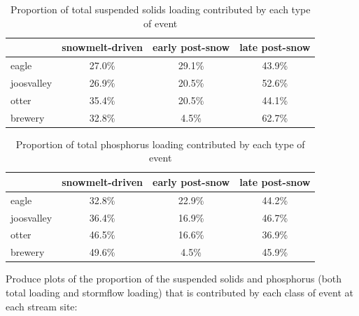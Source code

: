 \documentclass[12pt]{article}
\begin{document}
\begin{table}[h]
\begin{center}
\begin{tabular}{lccc}
  & snowmelt-driven & early post-snow & late post-snow \\ 
  \hline
eagle & 27.0\% & 29.1\% & 43.9\% \\ 
  joosvalley & 26.9\% & 20.5\% & 52.6\% \\ 
  otter & 35.4\% & 20.5\% & 44.1\% \\ 
  brewery & 32.8\% & 4.5\% & 62.7\% \\ 
  \end{tabular}
\caption{Proportion of total suspended solids loading contributed by each type of event}
\label{tab:stot}
\end{center}
\end{table}
\begin{table}[h]
\begin{center}
\begin{tabular}{lccc}
  & snowmelt-driven & early post-snow & late post-snow \\ 
  \hline
eagle & 32.8\% & 22.9\% & 44.2\% \\ 
  joosvalley & 36.4\% & 16.9\% & 46.7\% \\ 
  otter & 46.5\% & 16.6\% & 36.9\% \\ 
  brewery & 49.6\% & 4.5\% & 45.9\% \\ 
  \end{tabular}
\caption{Proportion of total phosphorus loading contributed by each type of event}
\label{tab:ptot}
\end{center}
\end{table}










Produce plots of the proportion of the suspended solids and phosphorus (both total loading and stormflow loading) that is contributed by each class of event at each stream site:\\
\end{document}
